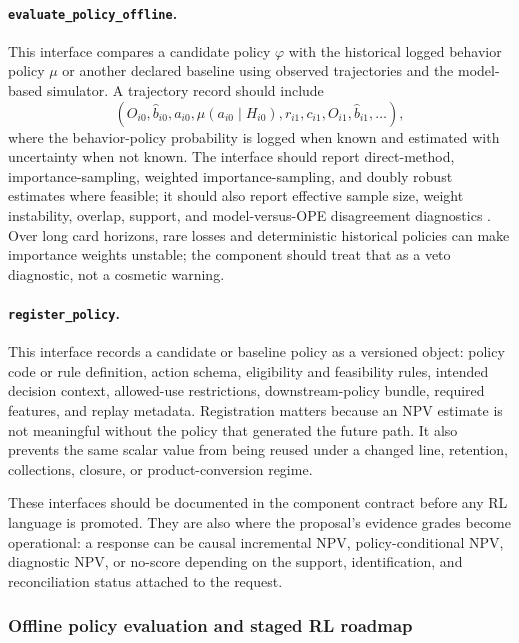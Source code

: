 \documentclass[11pt]{article}
\newcommand{\1}{\mathbf{1}}
\newcommand{\code}[1]{\nolinkurl{#1}}
\begin{document}
\paragraph{\code{evaluate_policy_offline}.}
This interface compares a candidate policy $\varphi$ with the historical logged
behavior policy $\mu$ or another declared baseline using observed trajectories
and the model-based simulator. A trajectory record should include
\[
  (O_{i0},\widehat b_{i0},a_{i0},\mu(a_{i0}\mid H_{i0}),
    r_{i1},c_{i1},O_{i1},\widehat b_{i1},\ldots),
\]
where the behavior-policy probability is logged when known and estimated with
uncertainty when not known. The interface should report direct-method,
importance-sampling, weighted importance-sampling, and doubly robust estimates
where feasible; it should also report effective sample size, weight instability,
overlap, support, and model-versus-OPE disagreement diagnostics
\citep{dudik2011dr,jiangli2016dr,thomasbrunskill2016ope,huwager2021pomdpope}.
Over long card horizons, rare losses and deterministic historical policies can
make importance weights unstable; the component should treat that as a veto
diagnostic, not a cosmetic warning.

\paragraph{\code{register_policy}.}
This interface records a candidate or baseline policy as a versioned object:
policy code or rule definition, action schema, eligibility and feasibility
rules, intended decision context, allowed-use restrictions, downstream-policy
bundle, required features, and replay metadata. Registration matters because an
NPV estimate is not meaningful without the policy that generated the future path.
It also prevents the same scalar value from being reused under a changed line,
retention, collections, closure, or product-conversion regime.

These interfaces should be documented in the component contract before any RL
language is promoted. They are also where the proposal's evidence grades become
operational: a response can be causal incremental NPV, policy-conditional NPV,
diagnostic NPV, or no-score depending on the support, identification, and
reconciliation status attached to the request.

\subsubsection{Offline policy evaluation and staged RL roadmap}
\label{subsec:state-space-ope-rl-roadmap}
\end{document}
